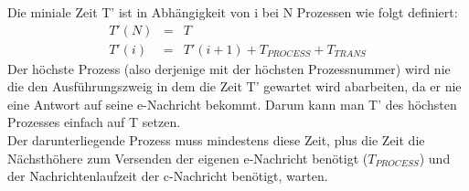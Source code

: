 Die miniale Zeit T' ist in Abhängigkeit von i bei N Prozessen wie folgt definiert:
\begin{eqnarray*}
  T'(N) & = & T \\
  T'(i) & = & T'(i+1) + T_{PROCESS} + T_{TRANS}
\end{eqnarray*}
Der höchste Prozess (also derjenige mit der höchsten Prozessnummer) wird nie die
den Ausführungszweig in dem die Zeit T' gewartet wird abarbeiten, da er nie eine
Antwort auf seine e-Nachricht bekommt. Darum kann man T' des höchsten Prozesses
einfach auf T setzen. \\
Der darunterliegende Prozess muss mindestens diese Zeit, plus die Zeit die
Nächsthöhere zum Versenden der eigenen e-Nachricht benötigt ($T_{PROCESS}$) und
der Nachrichtenlaufzeit der c-Nachricht benötigt, warten.
